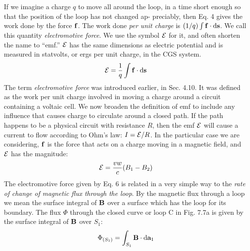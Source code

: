 If we imagine a charge $q$ to move all around the loop, in a time
short enough so that the position of the loop has not changed ap-
preciably, then Eq. 4 gives the work done by the force $\mathbf{f}$. The work
done \emph{per unit charge} is $(1/q)\int\mathbf{f}\cdot\textup{d}\mathbf{s}$.
We call this quantity \emph{electromotive force}.
We use the symbol $\mathcal{E}$ for it, and often shorten the name
to ``emf.'' $\mathcal{E}$ has the same dimensions as electric potential and is
measured in statvolts, or ergs per unit charge, in the CGS system.
\begin{equation}
  \mathcal{E} = \frac{1}{q}\int\mathbf{f}\cdot\textup{d}\mathbf{s}
\end{equation}
The term \emph{electromotive force} was introduced earlier, in Sec. 4.10. It
was defined as the work per unit charge involved in moving a charge
around a circuit containing a voltaic cell. We now broaden the
definition of emf to include any influence that causes charge to
circulate around a closed path. If the path happens to be a physical
circuit with resistance $R$, then the emf $\mathcal{E}$ will cause a current to flow
according to Ohm's law: $I = \mathcal{E}/R$. In the particular case we are considering,
$\mathbf{f}$ is the force that acts on a charge moving in a magnetic
field, and $\mathcal{E}$ has the magnitude:
\begin{equation}
  \mathcal{E} = \frac{vw}{c}(B_1-B_2)
\end{equation}
The electromotive force given by Eq. 6 is related in a very simple way
to the \emph{rate of change of magnetic flux through the loop}. By the magnetic
flux through a loop we mean the surface integral of $\mathbf{B}$ over a
surface which has the loop for its boundary. The flux $\Phi$ through the
closed curve or loop C in Fig. 7.7a is given by the surface integral
of $\mathbf{B}$ over $S_1$:
\begin{equation}
  \Phi_{(S_1)} = \int_{S_1} \mathbf{B}\cdot\textup{d}\mathbf{a}_1
\end{equation}

